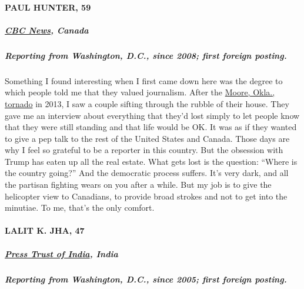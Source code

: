 \hypertarget{paul-hunter-59}{%
\paragraph{PAUL HUNTER, 59}\label{paul-hunter-59}}

\hypertarget{cbc-news-canada}{%
\subparagraph{\texorpdfstring{\textbf{\href{https://www.cbc.ca/news/world/paul-hunter-1.2449165}{CBC
News}, Canada}}{CBC News, Canada}}\label{cbc-news-canada}}

\hypertarget{reporting-from-washington-dc-since-2008-first-foreign-posting}{%
\subparagraph{\texorpdfstring{\textbf{Reporting from Washington, D.C.,
since 2008; first foreign
posting.}}{Reporting from Washington, D.C., since 2008; first foreign posting.}}\label{reporting-from-washington-dc-since-2008-first-foreign-posting}}

Something I found interesting when I first came down here was the degree
to which people told me that they valued journalism. After the
\href{https://www.nytimes3xbfgragh.onion/2013/05/21/us/tornado-oklahoma.html}{Moore,
Okla., tornado} in 2013, I saw a couple sifting through the rubble of
their house. They gave me an interview about everything that they'd lost
simply to let people know that they were still standing and that life
would be OK. It was as if they wanted to give a pep talk to the rest of
the United States and Canada. Those days are why I feel so grateful to
be a reporter in this country. But the obsession with Trump has eaten up
all the real estate. What gets lost is the question: ``Where is the
country going?'' And the democratic process suffers. It's very dark, and
all the partisan fighting wears on you after a while. But my job is to
give the helicopter view to Canadians, to provide broad strokes and not
to get into the minutiae. To me, that's the only comfort.

\hypertarget{lalit-k-jha-47}{%
\paragraph{LALIT K. JHA, 47}\label{lalit-k-jha-47}}

\hypertarget{press-trust-of-india-india}{%
\subparagraph{\texorpdfstring{\textbf{\href{http://www.ptinews.com/}{Press
Trust of India},
India}}{Press Trust of India, India}}\label{press-trust-of-india-india}}

\hypertarget{reporting-from-washington-dc-since-2005-first-foreign-posting}{%
\subparagraph{\texorpdfstring{\textbf{Reporting from Washington, D.C.,
since 2005; first foreign
posting.}}{Reporting from Washington, D.C., since 2005; first foreign posting.}}\label{reporting-from-washington-dc-since-2005-first-foreign-posting}}

